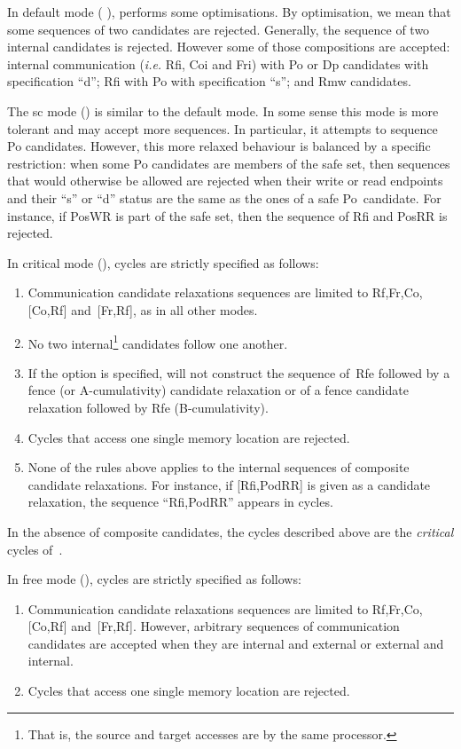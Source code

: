 \label{default:def}In default mode ( ), \diy{} performs some optimisations. By optimisation, we mean that some sequences of two candidates are rejected. Generally, the sequence of  two internal candidates is rejected. However some of those compositions are accepted: internal communication (\emph{i.e.} Rfi, Coi and Fri) with Po or Dp candidates with specification ``d'';
Rfi with Po with specification ``s''; and Rmw candidates.

\label{sc:def}The sc mode () is similar to the default mode. In some sense this mode is more tolerant and may accept more sequences. In particular, it attempts to sequence Po candidates. However, this more relaxed behaviour is balanced by a specific restriction: when some Po candidates are members of the safe set, then sequences that would otherwise be allowed are rejected when their write or read endpoints and their ``s'' or ``d'' status are the same as  the ones of a safe Po~candidate. For instance, if PosWR is part of the safe set, then the sequence of Rfi and PosRR is rejected.

\label{critical:def}%
In critical mode (),  cycles are strictly specified as
follows:
\begin{enumerate}
\item Communication candidate relaxations sequences are
limited to Rf,Fr,Co,[Co,Rf] and~[Fr,Rf], as in all other modes.
\item No two internal\footnote{That is, the source and target
accesses are by the same processor.} candidates follow one another.
\item If the option  is specified,
\diy{} will not construct
the sequence of~Rfe followed by a fence (or A-cumulativity) candidate
relaxation or of a fence candidate relaxation followed by Rfe (B-cumulativity).
\item Cycles that access one single memory location are rejected.
\item None of the rules above applies to the internal sequences of
composite candidate relaxations. For instance, if [Rfi,PodRR]
is given as a candidate relaxation, the sequence ``Rfi,PodRR'' appears
in cycles.
\end{enumerate}
In the absence of composite candidates,
the cycles described above are the \emph{critical} cycles of~\cite{ss88}.

\label{free:def}%
In free mode (), cycles are strictly specified as
follows:
\begin{enumerate}
\item Communication candidate relaxations sequences are
limited to Rf,Fr,Co,[Co,Rf] and~[Fr,Rf]. However, arbitrary sequences
of communication candidates are accepted when they are internal and external
or external and internal.
\item Cycles that access one single memory location are rejected.
\end{enumerate}

